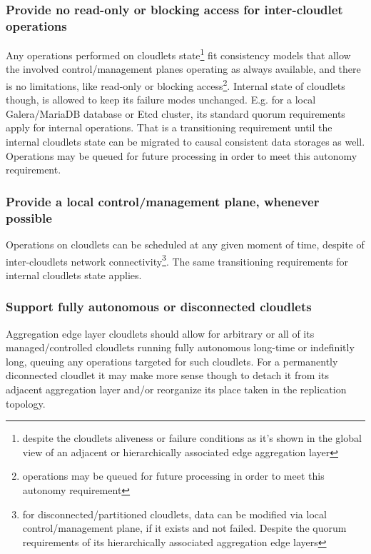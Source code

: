 \documentclass[conference]{IEEEtran}
\begin{document}
\subsubsection{Provide no read-only or blocking access for inter-cloudlet
operations}

Any operations performed on cloudlets state\footnote{despite the cloudlets
aliveness or failure conditions as it's shown in the global view of an adjacent
or hierarchically associated edge aggregation layer} fit consistency models
that allow the involved control/management planes operating as always
available, and there is no limitations, like read-only or blocking
access\footnote{operations may be queued for future processing in order to meet
this autonomy requirement}. Internal state of cloudlets though, is allowed to
keep its failure modes unchanged. E.g. for a local Galera/MariaDB database or
Etcd cluster, its standard quorum requirements apply for internal operations.
That is a transitioning requirement until the internal cloudlets state can be
migrated to causal consistent data storages as well. Operations may be queued
for future processing in order to meet this autonomy requirement.

\subsubsection{Provide a local control/management plane, whenever possible}

Operations on cloudlets can be scheduled at any given moment of time, despite
of inter-cloudlets network connectivity\footnote{for disconnected/partitioned
cloudlets, data can be modified via local control/management plane, if it
exists and not failed. Despite the quorum requirements of its hierarchically
associated aggregation edge layers}. The same transitioning requirements for
internal cloudlets state applies.

\subsubsection{Support fully autonomous or disconnected cloudlets}

Aggregation edge layer cloudlets should allow for arbitrary or all of
its managed/controlled cloudlets running fully autonomous long-time or
indefinitly long, queuing any operations targeted for such cloudlets.
For a permanently diconnected cloudlet it may make more sense though to
detach it from its adjacent aggregation layer and/or reorganize its place
taken in the replication topology.
\end{document}
